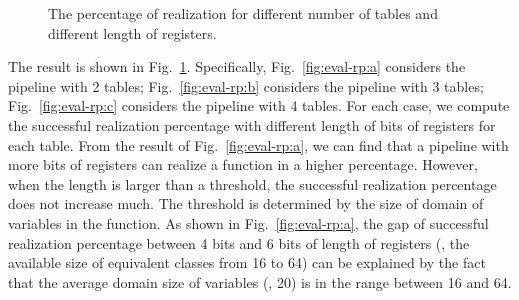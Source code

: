 \begin{figure}
  \centering
  \hspace{1in}
  \caption{The percentage of realization for different number of tables and different length of registers.}
  \label{fig:eval-rp} %
\end{figure}

 The result is shown in Fig.~\ref{fig:eval-rp}. Specifically, Fig.~\ref{fig:eval-rp:a} considers the pipeline with 2 tables; Fig.~\ref{fig:eval-rp:b} considers the pipeline with 3 tables; Fig.~\ref{fig:eval-rp:c} considers the pipeline with 4 tables. For each case, we compute the successful realization percentage with different length of bits of registers for each table. From the result of Fig.~\ref{fig:eval-rp:a}, we can find that a pipeline with more bits of registers can realize a function in a higher percentage. However, when the length is larger than a threshold, the successful realization percentage does not increase much. The threshold is determined by the size of domain of variables in the function. As shown in Fig.~\ref{fig:eval-rp:a}, the gap of successful realization percentage between 4 bits and 6 bits of length of registers (\ie, the available size of equivalent classes from 16 to 64) can be explained by the fact that the average domain size of variables (\ie, 20) is in the range between 16 and 64.

